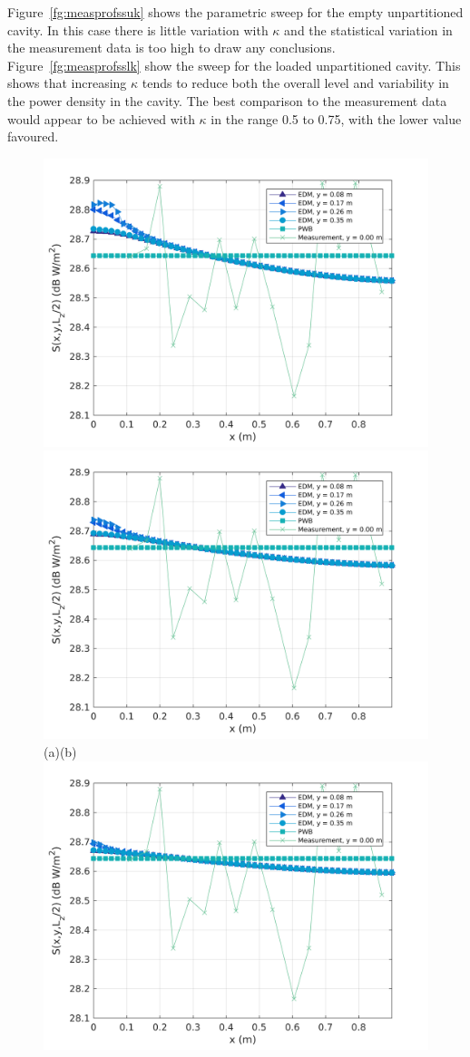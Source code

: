 \documentclass[a4paper]{article}
\numberwithin{equation}{section}
\newcounter{Figure}
\begin{document}
Figure~\ref{fg:measprofssuk} shows the parametric sweep for the empty unpartitioned cavity. In this case there
is little variation with $\kappa$ and the statistical variation in the measurement data is too high to draw any
conclusions. Figure~\ref{fg:measprofsslk} show the sweep for the loaded unpartitioned cavity. This shows that
increasing $\kappa$ tends to reduce both the overall level and variability in the power density in the cavity. 
The best comparison to the measurement data would appear to be achieved with $\kappa$ in the range 0.5 to 0.75, 
with the lower value favoured.

\begin{figure}[hp]
\begin{center}
\includegraphics[width=0.49\linewidth]{figures/SDM_3D_SU_PowerDensityProfileXMeas_JX_k0_5}
\includegraphics[width=0.49\linewidth]{figures/SDM_3D_SU_PowerDensityProfileXMeas_JX_k0_75}\\
{\footnotesize (a)\hspace{75mm}(b)}\\
\includegraphics[width=0.5\linewidth]{figures/SDM_3D_SU_PowerDensityProfileXMeas_JX_k1_0}\\

\end{center}
\end{figure}
\end{document}
